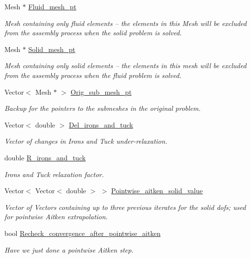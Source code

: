 \begin{DoxyCompactItemize}
Mesh $\ast$ \hyperlink{classoomph_1_1SegregatableFSIProblem_ada29fa4ef2ae7b6460887f8f04eba6bf}{Fluid\+\_\+mesh\+\_\+pt}
\begin{DoxyCompactList}\small\item\em Mesh containing only fluid elements -- the elements in this Mesh will be excluded from the assembly process when the solid problem is solved. \end{DoxyCompactList}\item 
Mesh $\ast$ \hyperlink{classoomph_1_1SegregatableFSIProblem_a3e7f6f5452767279d21ccbfc6336ef12}{Solid\+\_\+mesh\+\_\+pt}
\begin{DoxyCompactList}\small\item\em Mesh containing only solid elements -- the elements in this mesh will be excluded from the assembly process when the fluid problem is solved. \end{DoxyCompactList}\item 
Vector$<$ Mesh $\ast$ $>$ \hyperlink{classoomph_1_1SegregatableFSIProblem_a13ff18eb51b4eeb727443931cd19bac9}{Orig\+\_\+sub\+\_\+mesh\+\_\+pt}
\begin{DoxyCompactList}\small\item\em Backup for the pointers to the submeshes in the original problem. \end{DoxyCompactList}\item 
Vector$<$ double $>$ \hyperlink{classoomph_1_1SegregatableFSIProblem_a8f4545c1a2647486d550499aa89e3136}{Del\+\_\+irons\+\_\+and\+\_\+tuck}
\begin{DoxyCompactList}\small\item\em Vector of changes in Irons and Tuck under-\/relaxation. \end{DoxyCompactList}\item 
double \hyperlink{classoomph_1_1SegregatableFSIProblem_a7568103d53df9c84b86fdf41885cf289}{R\+\_\+irons\+\_\+and\+\_\+tuck}
\begin{DoxyCompactList}\small\item\em Irons and Tuck relaxation factor. \end{DoxyCompactList}\item 
Vector$<$ Vector$<$ double $>$ $>$ \hyperlink{classoomph_1_1SegregatableFSIProblem_aa193977e4617aee9906e59bdd31f2263}{Pointwise\+\_\+aitken\+\_\+solid\+\_\+value}
\begin{DoxyCompactList}\small\item\em Vector of Vectors containing up to three previous iterates for the solid dofs; used for pointwise Aitken extrapolation. \end{DoxyCompactList}\item 
bool \hyperlink{classoomph_1_1SegregatableFSIProblem_a0cef79bdf839668a2145e9fe5f77a5f2}{Recheck\+\_\+convergence\+\_\+after\+\_\+pointwise\+\_\+aitken}
\begin{DoxyCompactList}\small\item\em Have we just done a pointwise Aitken step. \end{DoxyCompactList}\end{DoxyCompactItemize}
